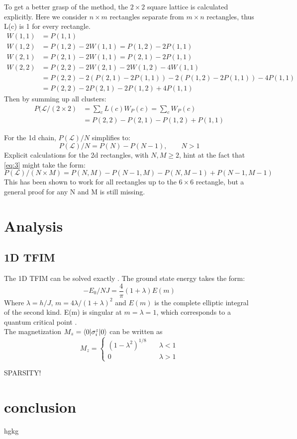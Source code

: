 \documentclass{article}
\begin{document}
To get a better grasp of the method, the $2 \times 2$ square lattice
is calculated explicitly. Here we consider $ n \times m$ rectangles separate from
$m \times n$ rectangles, thus L(c) is 1 for every rectangle.
\begin{align*}
W(1,1) &= P(1,1)\\
W(1,2) &= P(1,2) - 2W(1,1) = P(1,2) -2 P(1,1)\\
W(2,1) &= P(2,1) - 2W(1,1) = P(2,1) -2 P(1,1)\\
W(2,2) &= P(2,2) -2 W(2,1) -2 W(1,2) -4 W(1,1)\\
&= P(2,2) - 2 (P(2,1) -2
         P(1,1)) - 2(P(1,2) -2 P(1,1)) - 4 P(1,1)\\
&= P(2,2) -2 P(2,1) - 2 P(1,2) + 4 P(1,1)
\end{align*}
Then by summing up all clusters:
\begin{align}
\label{eq:17}
P(\mathcal{L}/(2 \times 2) &=\sum\limits_c L(c) W_P(c) = \sum\limits_c
                      W_P(c)\\
 &= P(2,2) - P(2,1) - P(1,2) + P(1,1)
\end{align}

For the 1d chain, $P(\mathcal{L})/N$ simplifies to:
\begin{equation}
\label{eq:20}
P(\mathcal{L})/N = P(N) - P(N-1), \qquad N>1
\end{equation}
Explicit calculations for the 2d rectangles, with $N,M \geq 2$, hint at the fact that
\eqref{eq:3} might take the form:
\begin{equation}
\label{eq:21}
P(\mathcal{L})/(N \times M) = P(N,M) - P(N-1,M) - P(N,M-1) +
P(N-1,M-1)
\end{equation}
This has been shown to work for all rectangles up to the $6 \times 6$
rectangle, but a general proof for any N and M is still missing.
\section{Analysis}
\subsection{1D TFIM}
The 1D TFIM can be solved exactly \cite{Pfeuty}. The ground state
energy takes the form:
\begin{equation}
\label{eq:22}
-E_0/NJ = \frac{4}{\pi} (1+ \lambda)E(m)
\end{equation}
Where $\lambda = h/J$, $m= 4\lambda /(1+\lambda)^2$ and $E(m)$ is the
complete elliptic integral of the second kind. E(m) is singular at $m
= \lambda = 1$, which corresponds to a quantum critical point \cite{Series}.\\
The magnetization $M_z = \braket{0|\sigma_i^z|0}$ can be written as
\begin{equation}
\label{eq:13}
M_z = 
\begin{cases} (1-\lambda^2)^{1/8} & \quad \lambda <1\\
0 & \quad \lambda >1
\end{cases}
\end{equation}

SPARSITY!

\section{conclusion}
hgkg 

\medskip




\end{document}
